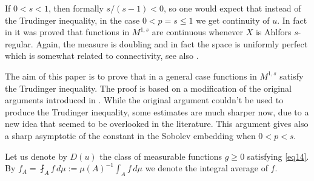 \documentclass[12pt,leqno]{amsart}
\theoremstyle{definition}
\numberwithin{theorem}{section} \numberwithin{equation}{section}
\begin{document}
If $0<s<1$, then formally $s/(s-1)<0$, so one would expect that instead of the Trudinger inequality, in the case $0<p=s\leq 1$ we get continuity of $u$. In fact in \cite{zhou} it was proved that functions in $M^{1,s}$ are continuous whenever $X$ is Ahlfors $s$-regular. Again, the measure is doubling and in fact the space is uniformly perfect which is somewhat related to connectivity, see also \cite{Bondarev,GorkaS}.

The aim of this paper is to prove that in a general case functions in $M^{1,s}$ satisfy the Trudinger inequality. The proof is based on a modification of the original arguments introduced in \cite{hajlasz}. While the original argument couldn't be used to produce the Trudinger inequality, some estimates are much sharper now, due to a new idea that seemed to be overlooked in the literature. This argument gives also a sharp asymptotic of the constant in the Sobolev embedding when $0<p<s$.

Let us denote by $D(u)$ the class of measurable functions $g\geq 0$ satisfying \eqref{eq14}. 
By $f_A=\fint_A f\, d\mu:=\mu(A)^{-1}\int_A f\, d\mu$ we denote the integral average of $f$.
\end{document}
